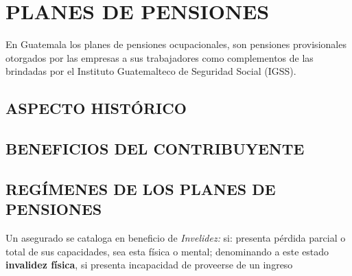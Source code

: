 \chapter{PLANES DE PENSIONES }

En Guatemala los planes de pensiones ocupacionales, son pensiones provisionales otorgados por las empresas a sus trabajadores como complementos de las brindadas por el Instituto Guatemalteco de Seguridad Social (IGSS). 


\section{ASPECTO HISTÓRICO}





\section{BENEFICIOS DEL CONTRIBUYENTE}





\section{REGÍMENES DE LOS PLANES DE PENSIONES}


Un asegurado se cataloga en beneficio de \textit{Invelidez:} si: presenta pérdida parcial o total de sus capacidades, sea esta física o mental; denominando a este estado \textbf{invalidez física}, si presenta incapacidad de proveerse de un ingreso 
